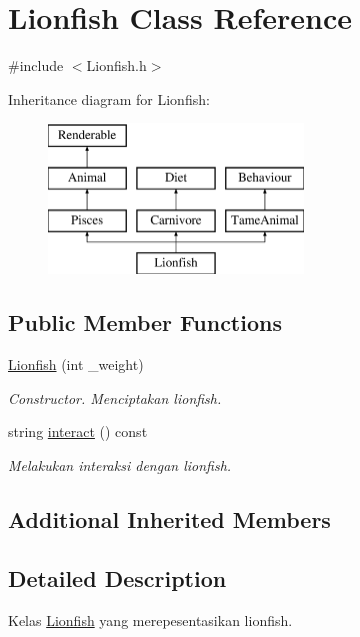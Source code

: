\hypertarget{classLionfish}{\section{Lionfish Class Reference}
\label{classLionfish}
}


{\ttfamily \#include $<$Lionfish.\+h$>$}

Inheritance diagram for Lionfish\+:\begin{figure}[H]
\begin{center}
\leavevmode
\includegraphics[height=4.000000cm]{classLionfish}
\end{center}
\end{figure}
\subsection*{Public Member Functions}
\begin{DoxyCompactItemize}
\item 
\hypertarget{classLionfish_ad6ddd21f4697048c5ba38dbfbdd7081d}{\hyperlink{classLionfish_ad6ddd21f4697048c5ba38dbfbdd7081d}{Lionfish} (int \+\_\+weight)}\label{classLionfish_ad6ddd21f4697048c5ba38dbfbdd7081d}

\begin{DoxyCompactList}\small\item\em Constructor. Menciptakan lionfish. \end{DoxyCompactList}\item 
string \hyperlink{classLionfish_aa5bdb90e93360ae9e9e2fda9a6480c5d}{interact} () const 
\begin{DoxyCompactList}\small\item\em Melakukan interaksi dengan lionfish. \end{DoxyCompactList}\end{DoxyCompactItemize}
\subsection*{Additional Inherited Members}


\subsection{Detailed Description}
Kelas \hyperlink{classLionfish}{Lionfish} yang merepesentasikan lionfish. 

